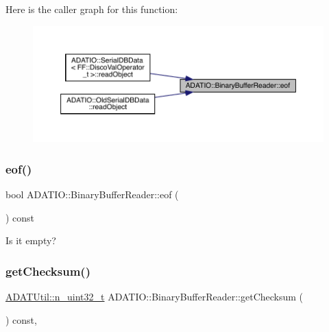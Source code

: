 Here is the caller graph for this function\+:\nopagebreak
\begin{figure}[H]
\begin{center}
\leavevmode
\includegraphics[width=350pt]{d0/df3/classADATIO_1_1BinaryBufferReader_ad7957f285235c272d8874d1ab5ffea75_icgraph}
\end{center}
\end{figure}
\mbox{\label{classADATIO_1_1BinaryBufferReader_ad7957f285235c272d8874d1ab5ffea75}} 
\subsubsection{\texorpdfstring{eof()}{eof()}\hspace{0.1cm}{\footnotesize\ttfamily [2/2]}}
{\footnotesize\ttfamily bool A\+D\+A\+T\+I\+O\+::\+Binary\+Buffer\+Reader\+::eof (\begin{DoxyParamCaption}{ }\end{DoxyParamCaption}) const}



Is it empty? 

\mbox{\label{classADATIO_1_1BinaryBufferReader_ae8e6c22be76223f5e2ce2613e70be4bf}} 
\subsubsection{\texorpdfstring{getChecksum()}{getChecksum()}\hspace{0.1cm}{\footnotesize\ttfamily [1/2]}}
{\footnotesize\ttfamily \mbox{\hyperlink{namespaceADATUtil_ad945a8afa4db2d1f89b731964adae97e}{A\+D\+A\+T\+Util\+::n\+\_\+uint32\+\_\+t}} A\+D\+A\+T\+I\+O\+::\+Binary\+Buffer\+Reader\+::get\+Checksum (\begin{DoxyParamCaption}{ }\end{DoxyParamCaption}) const\hspace{0.3cm}{\ttfamily [inline]}, {\ttfamily [virtual]}}



